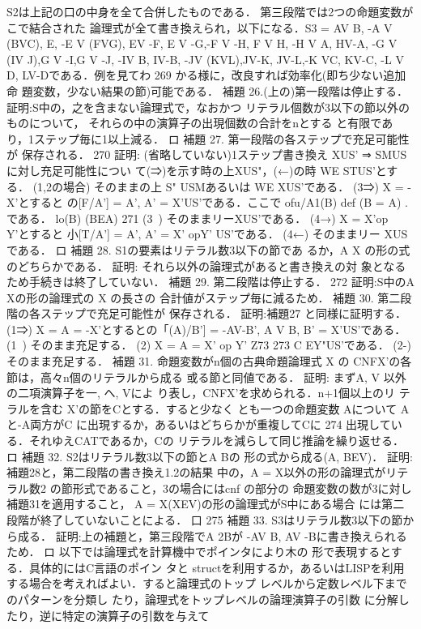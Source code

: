 \documentclass{ltjsarticle}
\theoremstyle{mystyle1}
\theoremstyle{mystyle2}
\begin{document}
S2は上記の口の中身を全て合併したものである． 第三段階では2つの命題変数がこで結合された 論理式が全て書き換えられ，以下になる．S3 = {AV B, -A V (BVC), E, -E V (FVG), EV -F, E V -G,-F V -H, F V H, -H V A, HV-A, -G V (IV J),G V -I,G V -J, -IV B, IV-B, -JV (KVL),JV-K, JV-L,-K VC, KV-C, -L V D, LV-D}である．例を見てわ
269
かる様に，改良すれば効率化(即ち少ない追加命 題変数，少ない結果の節)可能である．
補題 26.(上の)第一段階は停止する．
証明:S中の，之を含まない論理式で，なおかつ リテラル個数が3以下の節以外のものについて， それらの中の演算子の出現個数の合計をnとする と有限であり，1ステップ毎に1以上減る． ロ
補題 27. 第一段階の各ステップで充足可能性が 保存される．
270
証明: (省略していない)1ステップ書き換え {X}US' ⇒ SMUSに対し充足可能性につい て(⇒)を示す時の上{X}US"，(←)の時 WE STUS'とする． (1,2の場合) そのままの上 S" USMあるいは WE {X}US'である． (3⇒) X = -X'とすると の[F/A'] = { A', A' = X'}US'である．ここで ofu/A1(B) def  (B = A) .
である． lo(B) (BEA)
271
(3~) そのままリー{X}US'である． (4→) X = X'op Y'とすると 小[T/A'] = {A', A' = X' opY'} US'である． (4←) そのままリー {X}USである． ロ 補題 28. S1の要素はリテラル数3以下の節であ るか，A X の形の式のどちらかである．
証明: それら以外の論理式があると書き換えの対 象となるため手続きは終了していない．
補題 29. 第二段階は停止する．
272
証明:S中のA Xの形の論理式の X の長さの 合計値がステップ毎に減るため．
補題 30. 第二段階の各ステップで充足可能性が 保存される．
証明:補題27 と同様に証明する． (1⇒) X = A = -X'とするとの「(A)/B'] = {-AV-B', A V B, B' = X'}US'である． (1~) そのまま充足する． (2) X = A = X' op Y' Z73%
273
C EY"US'である． (2-) そのまま充足する．
補題 31. 命題変数がn個の古典命題論理式 X の CNFX'の各節は，高々n個のリテラルから成る 或る節と同値である．
証明: まずA, V 以外の二項演算子を一, へ, Vによ り表し，CNFX'を求められる．n+1個以上のリ テラルを含む X'の節をCとする．すると少なく とも一つの命題変数 Aについて Aと-A両方がC に出現するか，あるいはどちらかが重複してCに
274
出現している．それゆえCATであるか，Cの リテラルを減らして同じ推論を繰り返せる． ロ
補題 32. S2はリテラル数3以下の節とA Bの 形の式から成る(A, BEV)．
証明:補題28と，第二段階の書き換え1.2の結果 中の，A = X以外の形の論理式がリテラル数2 の節形式であること，3の場合にはcnf の部分の 命題変数の数が3に対し補題31を適用すること， A = X(XEV)の形の論理式がS中にある場合 には第二段階が終了していないことによる． 口
275
補題 33. S3はリテラル数3以下の節から成る．
証明:上の補題と，第三段階でA 2Bが -AV B, AV -Bに書き換えられるため．
ロ
以下では論理式を計算機中でポインタにより木の 形で表現するとする．具体的にはC言語のポイン タと structを利用するか，あるいはLISPを利用 する場合を考えればよい．すると論理式のトップ レベルから定数レベル下までのパターンを分類し たり，論理式をトップレベルの論理演算子の引数 に分解したり，逆に特定の演算子の引数を与えて
\end{document}
